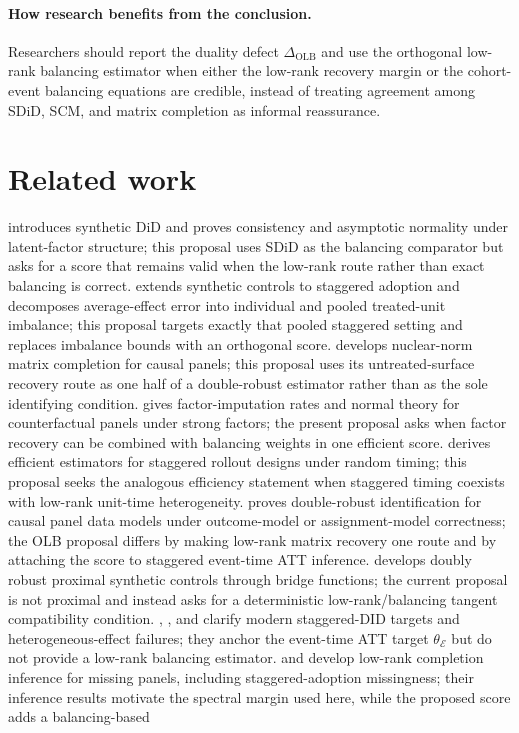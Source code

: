 \documentclass[11pt]{article}
\theoremstyle{definition}
\theoremstyle{plain}
\theoremstyle{remark}
\begin{document}
\paragraph{How research benefits from the conclusion.}
Researchers should report the duality defect \(\Delta_{\mathrm{OLB}}\) and use the orthogonal low-rank balancing estimator when either the low-rank recovery margin or the cohort-event balancing equations are credible, instead of treating agreement among SDiD, SCM, and matrix completion as informal reassurance.

\section{Related work}
\citet[Sections 2--3]{ArkhangelskyAtheyHirshbergImbensWager2021} introduces synthetic DiD and proves consistency and asymptotic normality under latent-factor structure; this proposal uses SDiD as the balancing comparator but asks for a score that remains valid when the low-rank route rather than exact balancing is correct.  \citet[Section 2.2 and Theorem 1]{BenMichaelFellerRothstein2022} extends synthetic controls to staggered adoption and decomposes average-effect error into individual and pooled treated-unit imbalance; this proposal targets exactly that pooled staggered setting and replaces imbalance bounds with an orthogonal score.  \citet[Sections 2--3]{AtheyBayatiDoudchenkoImbensKhosravi2021} develops nuclear-norm matrix completion for causal panels; this proposal uses its untreated-surface recovery route as one half of a double-robust estimator rather than as the sole identifying condition.  \citet{BaiNg2021} gives factor-imputation rates and normal theory for counterfactual panels under strong factors; the present proposal asks when factor recovery can be combined with balancing weights in one efficient score.  \citet[Sections 3--4]{RothSantAnna2021} derives efficient estimators for staggered rollout designs under random timing; this proposal seeks the analogous efficiency statement when staggered timing coexists with low-rank unit-time heterogeneity.  \citet[Sections 2--3]{ArkhangelskyImbens2022} proves double-robust identification for causal panel data models under outcome-model or assignment-model correctness; the OLB proposal differs by making low-rank matrix recovery one route and by attaching the score to staggered event-time ATT inference.  \citet[Sections 2--3]{QiuShiMiaoWangDobribanTchetgen2024} develops doubly robust proximal synthetic controls through bridge functions; the current proposal is not proximal and instead asks for a deterministic low-rank/balancing tangent compatibility condition.  \citet{CallawaySantAnna2021}, \citet{SunAbraham2021}, and \citet{DeChaisemartinDHaultfoeuille2020} clarify modern staggered-DID targets and heterogeneous-effect failures; they anchor the event-time ATT target \(\theta_{\mathcal{E}}\) but do not provide a low-rank balancing estimator.  \citet[Sections 2--3]{ChoiKwonLiao2024} and \citet[Sections 2--3]{YanWainwright2024} develop low-rank completion inference for missing panels, including staggered-adoption missingness; their inference results motivate the spectral margin used here, while the proposed score adds a balancing-based 
\end{document}

